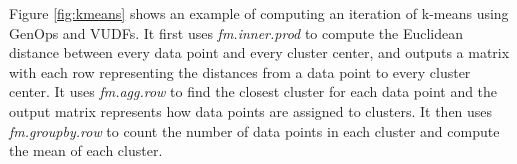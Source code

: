 Figure \ref{fig:kmeans} shows an example of computing an iteration of k-means
\cite{kmeans} using GenOps and VUDFs. It first uses \textit{fm.inner.prod} to
compute the Euclidean distance between every data point and every cluster center,
and outputs a matrix with each row representing the distances from a data
point to every cluster center. It uses \textit{fm.agg.row} to find the closest
cluster for each data point and the output matrix represents how data points
are assigned to clusters. It then uses \textit{fm.groupby.row} to count
the number of data points in each cluster and compute the mean of each cluster.





